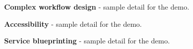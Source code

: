 \documentclass[11pt,a4paper]{article}
\begin{document}
\begin{resumeitems}
    \item \textbf{Complex workflow design} - sample detail for the demo.
    \item \textbf{Accessibility} - sample detail for the demo.
    \item \textbf{Service blueprinting} - sample detail for the demo.
\end{resumeitems}
\end{document}
